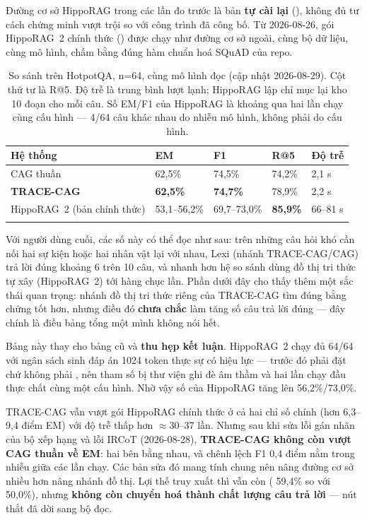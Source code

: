 Đường cơ sở HippoRAG trong các lần đo trước là bản \textbf{tự cài lại}
(), không đủ tư cách chứng minh vượt trội so với công trình
đã công bố. Từ 2026-08-26, gói HippoRAG~2 chính thức ()
được chạy như đường cơ sở ngoài, cùng bộ dữ liệu, cùng mô hình, chấm bằng đúng
hàm chuẩn hoá SQuAD của repo.

\begin{longtable}{L{3.8cm} R{1.8cm} R{1.8cm} R{2.0cm} R{2.2cm}}
\toprule
\textbf{Hệ thống} & \textbf{EM} & \textbf{F1} & \textbf{R@5} & \textbf{Độ trễ}\\
\midrule
\endhead
CAG thuần & 62,5\% & 74,5\% & 74,2\% & 2,1 s\\
\textbf{TRACE-CAG} & \textbf{62,5\%} & \textbf{74,7\%} & 78,9\% & 2,2 s\\
HippoRAG~2 (bản chính thức) & 53,1--56,2\% & 69,7--73,0\% & \textbf{85,9\%} & 66--81 s\\
\bottomrule
\caption{So sánh trên HotpotQA, n=64, cùng mô hình đọc (cập nhật 2026-08-29).
Cột thứ tư là R@5. Độ trễ là trung bình lượt lạnh; HippoRAG lập chỉ mục lại kho
10 đoạn cho mỗi câu. Số EM/F1 của HippoRAG là khoảng qua hai lần chạy cùng cấu
hình --- 4/64 câu khác nhau do nhiễu mô hình, không phải do cấu hình.}
\end{longtable}

Với người dùng cuối, các số này có thể đọc như sau: trên những câu hỏi khó cần nối hai sự
kiện hoặc hai nhân vật lại với nhau, Lexi (nhánh TRACE-CAG/CAG) trả lời đúng khoảng 6 trên
10 câu, và nhanh hơn hệ so sánh dùng đồ thị tri thức tự xây (HippoRAG~2) tới hàng chục lần.
Phần dưới đây cho thấy thêm một sắc thái quan trọng: nhánh đồ thị tri thức riêng của
TRACE-CAG tìm đúng bằng chứng tốt hơn, nhưng điều đó \textbf{chưa chắc} làm tăng số câu trả
lời đúng — đây chính là điều bảng tổng một mình không nói hết.

Bảng này thay cho bảng cũ và \textbf{thu hẹp kết luận}. HippoRAG~2 chạy đủ 64/64 với
ngân sách sinh đáp án 1024 token thực sự có hiệu lực --- trước đó phải đặt
 chứ không phải , nên tham số bị
thư viện ghi đè âm thầm và hai lần chạy đầu thực chất cùng một cấu hình. Nhờ vậy
số của HippoRAG tăng lên 56,2\%/73,0\%.

TRACE-CAG vẫn vượt gói HippoRAG chính thức ở cả hai chỉ số chính (hơn 6,3--9,4
điểm EM) với độ trễ thấp hơn $\approx$30--37 lần. Nhưng sau khi sửa lỗi gán nhãn của bộ xếp hạng và lỗi IRCoT
(2026-08-28), \textbf{TRACE-CAG không còn vượt CAG thuần về EM}: hai bên bằng nhau,
và chênh lệch F1 0,4 điểm nằm trong nhiễu giữa các lần chạy. Các bản sửa đó mang
tính chung nên nâng đường cơ sở nhiều hơn nâng nhánh đồ thị. Lợi thế truy xuất thì
vẫn còn ( 59,4\% so với 50,0\%), nhưng \textbf{không còn chuyển
hoá thành chất lượng câu trả lời} --- nút thắt đã dời sang bộ đọc.


